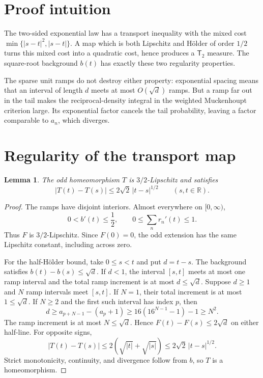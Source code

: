 \documentclass[11pt]{article}
\newtheorem{lemma}{Lemma}
\newcommand{\R}{\mathbb{R}}
\newcommand{\Ttwo}{\mathsf{T}_2}
\begin{document}
\section{Proof intuition}

The two-sided exponential law has a transport inequality with the mixed cost
$\min\{|s-t|^2,|s-t|\}$.  A map which is both Lipschitz and H\"older of order
$1/2$ turns this mixed cost into a quadratic cost, hence produces a $\Ttwo$
measure.  The square-root background $b(t)$ has exactly these two regularity
properties.

The sparse unit ramps do not destroy either property: exponential spacing
means that an interval of length $d$ meets at most $O(\sqrt d)$ ramps.  But a
ramp far out in the tail makes the reciprocal-density integral in the
weighted Muckenhoupt criterion large.  Its exponential factor cancels the
tail probability, leaving a factor comparable to $a_n$, which diverges.

\section{Regularity of the transport map}

\begin{lemma}\label{lem:regularity}
The odd homeomorphism $T$ is $3/2$-Lipschitz and satisfies
\[
 |T(t)-T(s)|\leq 2\sqrt2\,|t-s|^{1/2}
 \qquad(s,t\in\R).
\]
\end{lemma}

\begin{proof}
The ramps have disjoint interiors.  Almost everywhere on $[0,\infty)$,
\[
 0<b'(t)\leq\frac12,
 \qquad 0\leq \sum_nr_n'(t)\leq1.
\]
Thus $F$ is $3/2$-Lipschitz.  Since $F(0)=0$, the odd extension has the same
Lipschitz constant, including across zero.

For the half-H\"older bound, take $0\leq s<t$ and put $d=t-s$.  The background
satisfies $b(t)-b(s)\leq\sqrt d$.  If $d<1$, the interval $[s,t]$ meets at
most one ramp interval and the total ramp increment is at most
$d\leq\sqrt d$.  Suppose $d\geq1$ and $N$ ramp intervals meet $[s,t]$.
If $N=1$, their total increment is at most $1\leq\sqrt d$.  If $N\geq2$ and
the first such interval has index $p$, then
\[
 d\geq a_{p+N-1}-(a_p+1)
 \geq16(16^{N-1}-1)-1\geq N^2.
\]
The ramp increment is at most $N\leq\sqrt d$.  Hence
$F(t)-F(s)\leq2\sqrt d$ on either half-line.  For opposite signs,
\[
 |T(t)-T(s)|\leq2(\sqrt{|t|}+\sqrt{|s|})
 \leq2\sqrt2\,|t-s|^{1/2}.
\]
Strict monotonicity, continuity, and divergence follow from $b$, so $T$ is a
homeomorphism.
\end{proof}
\end{document}

